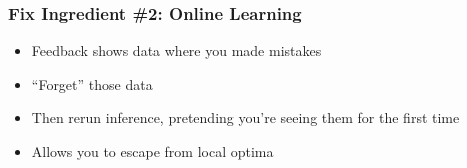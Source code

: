 \documentclass[compress]{beamer}
\begin{document}
\begin{frame}

        \frametitle{Fix Ingredient \#2: Online Learning}

        \begin{itemize}
                \item Feedback shows data where you made mistakes
                \item ``Forget'' those data~\cite{yao-09}
                \item Then rerun inference, pretending you're seeing them for the first time
                \item Allows you to escape from local optima
        \end{itemize}

\end{frame}
\end{document}
